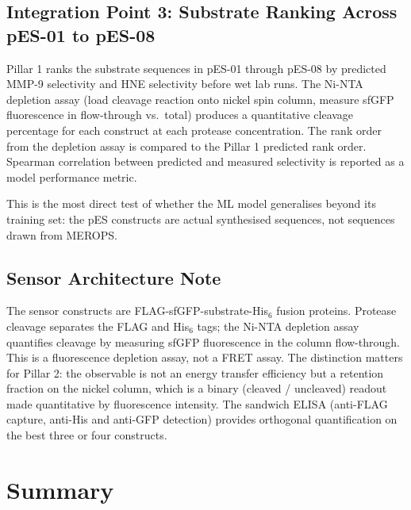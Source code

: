 \documentclass[10pt,a4paper]{article}
\begin{document}
\subsection{Integration Point 3: Substrate Ranking Across pES-01 to pES-08}

Pillar 1 ranks the substrate sequences in pES-01 through pES-08 by predicted
MMP-9 selectivity and HNE selectivity before wet lab runs.
The Ni-NTA depletion assay (load cleavage reaction onto nickel spin column,
measure sfGFP fluorescence in flow-through vs.\ total) produces a quantitative
cleavage percentage for each construct at each protease concentration.
The rank order from the depletion assay is compared to the Pillar 1 predicted
rank order.  Spearman correlation between predicted and measured selectivity
is reported as a model performance metric.

This is the most direct test of whether the ML model generalises beyond its
training set: the pES constructs are actual synthesised sequences, not sequences
drawn from MEROPS.

\subsection{Sensor Architecture Note}

The sensor constructs are FLAG-sfGFP-substrate-His$_6$ fusion proteins.
Protease cleavage separates the FLAG and His$_6$ tags; the Ni-NTA depletion
assay quantifies cleavage by measuring sfGFP fluorescence in the column
flow-through.  This is a fluorescence depletion assay, not a FRET assay.
The distinction matters for Pillar 2: the observable is not an energy transfer
efficiency but a retention fraction on the nickel column, which is a binary
(cleaved / uncleaved) readout made quantitative by fluorescence intensity.
The sandwich ELISA (anti-FLAG capture, anti-His and anti-GFP detection) provides
orthogonal quantification on the best three or four constructs.

\section{Summary}
\end{document}
